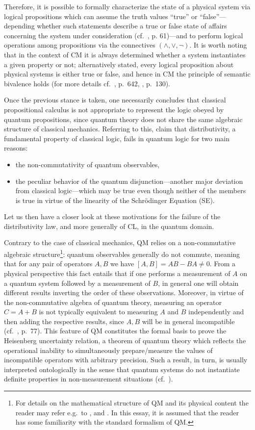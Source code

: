 \documentclass[11pt, executivepaper]{article}
\begin{document}
Therefore, it is possible to formally characterize the state of a physical system via logical propositions which can assume the truth values ``true'' or ``false''---depending whether such statements describe a true or false state of affairs concerning the system under consideration (cf.\ \cite{Jaeger:2009}, p. 61)---and to perform logical operations among propositions via the connectives $(\wedge, \vee, \neg)$. It is worth noting that in the context of CM it is always determined whether a system instantiates a given property or not; alternatively stated, every logical proposition about physical systems is either true or false, and hence in CM the principle of semantic bivalence holds (for more details cf.\ \cite{Bub:2007}, p.\ 642, \cite{Giuntini:2002}, p.\ 130).

Once the previous stance is taken, one necessarily concludes that classical propositional calculus is not appropriate to represent the logic obeyed by quantum propositions, since quantum theory does not share the same algebraic structure of classical mechanics. Referring to this, \cite{Giuntini:2002} claim that distributivity, a fundamental property of classical logic, fails in quantum logic for two main reasons:
\begin{itemize}
	\item the non-commutativity of quantum observables,
	\item the peculiar behavior of the quantum disjunction---another major deviation from classical logic---which may be true even though neither of the members is true in virtue of the linearity of the Schr\"odinger Equation (SE). 
\end{itemize}
\noindent Let us then have a closer look at these motivations for the failure of the distributivity law, and more generally of CL, in the quantum domain.

Contrary to the case of classical mechanics, QM relies on a non-commutative algebraic structure\footnote{For details on the mathematical structure of QM and its physical content the reader may refer e.g.\ to \cite{Sakurai1994}, and \cite{Griffiths:2014}. In this essay, it is assumed that the reader has some familiarity with the standard formalism of QM.}: quantum observables generally do not commute, meaning that for any pair of operators $A,B$ we have $[A,B]=AB-BA\neq0$. From a physical perspective this fact entails that if one performs a measurement of $A$ on a quantum system followed by a measurement of $B$, in general one will obtain different results inverting the order of these observations. Moreover, in virtue of the non-commutative algebra of quantum theory, measuring an operator $C=A+B$ is not typically equivalent to measuring $A$ and $B$ independently and then adding the respective results, since $A,B$ will be in general incompatible (cf.\ \cite{David:2015}, p.\ 77). This feature of QM constitutes the formal basis to prove the Heisenberg uncertainty relation, a theorem of quantum theory which reflects the operational inability to simultaneously prepare/measure the values of incompatible operators with arbitrary precision. Such a result, in turn, is usually interpreted ontologically in the sense that quantum systems do not instantiate definite properties in non-measurement situations (cf.\ \cite{Sakurai1994}).
\end{document}
